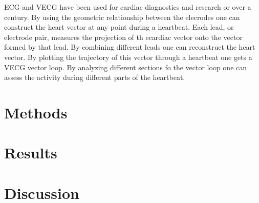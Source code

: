 \documentclass[12pt]{article}
\begin{document}
\par{}
ECG and VECG have been used for cardiac diagnostics and research or over a century. By using the geometric relationship between the elecrodes one can construct the heart vector at any point during a heartbeat. Each lead, or electrode pair, measures the projection of th ecardiac vector onto the vector formed by that lead. By combining different leads one can reconstruct the heart vector. By plotting the trajectory of this vector through a heartbeat one gets a VECG vector loop. By analyzing different sections fo the vector loop one can assess the activity during different parts of the heartbeat.
\par{}
\section{Methods}


\section{Results}

\section{Discussion}





\end{document}
